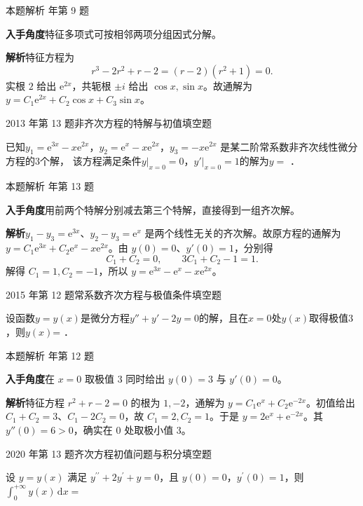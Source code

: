 \documentclass[UTF8,zihao=-4,fontset=fandol]{ctexart}
\newcommand{\blank}{\underline{\hspace{5em}}}
\newcommand{\QuestionPage}[6]{%
  \par\noindent\begin{minipage}{\linewidth}
  \raggedright
  {\small\textcolor{black!60}{#3\quad #5}\hfill\textcolor{accent}{#2}}\par\smallskip}
\newcommand{\QuestionEnd}{\end{minipage}\par\medskip}
\newcommand{\QuestionPage}[6]{%
  \clearpage
  {\small\textcolor{accent}{#1\hfill #2}}\par\medskip
  {\small\textcolor{black!60}{#3\quad #5\hfill #6}}\par\vspace{9bp}}
\newcommand{\QuestionEnd}{}
\newenvironment{QuestionSolution}[1]{%
  \clearpage
  {\small\textcolor{black!60}{本题解析\quad #1}}\par\medskip
}{\par\clearpage}
\begin{document}
\begin{QuestionSolution}{2010 年第 9 题}
\textbf{入手角度}\quad 特征多项式可按相邻两项分组因式分解。

\textbf{解析}\quad 特征方程为
\[
r^3-2r^2+r-2=(r-2)(r^2+1)=0.
\]
实根 \(2\) 给出 \(\mathrm{e}^{2x}\)，共轭根 \(\pm i\) 给出 \(\cos x,\sin x\)。故通解为 \(\boxed{y=C_1\mathrm{e}^{2x}+C_2\cos x+C_3\sin x}\)。
\end{QuestionSolution}

\QuestionPage{4.2 高阶线性微分方程}{填空题}{2013 年第 13 题}{2}{非齐次方程的特解与初值}{226 / 234}
已知$y_1 = \mathrm{e}^{3x} - x\mathrm{e}^{2x}$，$y_2 = \mathrm{e}^x - x\mathrm{e}^{2x}$，$y_3 = - x\mathrm{e}^{2x}$
是某二阶常系数非齐次线性微分方程的$3$个解，
该方程满足条件$y\big|_{x = 0} = 0$，$y'\big|_{x = 0} = 1$的解为$y =$ \blank{}．
\QuestionEnd

\begin{QuestionSolution}{2013 年第 13 题}
\textbf{入手角度}\quad 用前两个特解分别减去第三个特解，直接得到一组齐次解。

\textbf{解析}\quad \(y_1-y_3=\mathrm{e}^{3x}\)、\(y_2-y_3=\mathrm{e}^x\) 是两个线性无关的齐次解。故原方程的通解为 \(y=C_1\mathrm{e}^{3x}+C_2\mathrm{e}^x-x\mathrm{e}^{2x}\)。由 \(y(0)=0\)、\(y'(0)=1\)，分别得
\[
C_1+C_2=0,\qquad 3C_1+C_2-1=1 .
\]
解得 \(C_1=1,C_2=-1\)，所以 \(y=\boxed{\mathrm{e}^{3x}-\mathrm{e}^x-x\mathrm{e}^{2x}}\)。
\end{QuestionSolution}

\QuestionPage{4.2 高阶线性微分方程}{填空题}{2015 年第 12 题}{2}{常系数齐次方程与极值条件}{227 / 234}
设函数$y = y(x)$是微分方程$y'' + y' - 2y = 0$的解，且在$x = 0$处$y(x)$取得极值$3$，则$y(x)$= \blank{}．
\QuestionEnd

\begin{QuestionSolution}{2015 年第 12 题}
\textbf{入手角度}\quad 在 \(x=0\) 取极值 \(3\) 同时给出 \(y(0)=3\) 与 \(y'(0)=0\)。

\textbf{解析}\quad 特征方程 \(r^2+r-2=0\) 的根为 \(1,-2\)，通解为 \(y=C_1\mathrm{e}^x+C_2\mathrm{e}^{-2x}\)。初值给出 \(C_1+C_2=3\)、\(C_1-2C_2=0\)，故 \(C_1=2,C_2=1\)。于是 \(y=\boxed{2\mathrm{e}^x+\mathrm{e}^{-2x}}\)。其 \(y''(0)=6>0\)，确实在 \(0\) 处取极小值 \(3\)。
\end{QuestionSolution}

\QuestionPage{4.2 高阶线性微分方程}{填空题}{2020 年第 13 题}{2}{齐次方程初值问题与积分}{228 / 234}
设 \(y = y\left( x \right)\) 满足 \(y^{\prime\prime} + 2y^{\prime} + y = 0\)，且 \(y\left( 0 \right) = 0\)，\(y^{\prime}\left( 0 \right) = 1\)，则 \(\int_{0}^{+\infty}{y\left( x \right) \,\mathrm{d} x} =\)
\blank{}
\QuestionEnd
\end{document}
